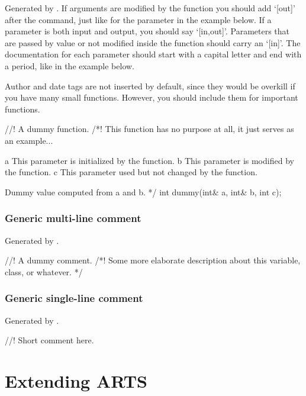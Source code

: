 Generated by . If
arguments are modified by the function you should add `[out]' after
the  command, just like for the parameter
 in the example below. If a parameter is both input and
output, you should say `[in,out]'. Parameters that are passed by
value or not modified inside the function should carry an `[in]'. The
documentation for each parameter should start with a capital letter and
end with a period, like in the example below.

Author and date tags are not inserted by default, since they would be
overkill if you have many small functions. However, you should include
them for important functions. 

\begin{code}
//! A dummy function.
/*! 
 This function has no purpose at all,
 it just serves as an example... 

\param[out]     a This parameter is initialized by the
                  function.
\param[in,out]  b This parameter is modified by the function.
\param[in]      c This parameter used but not changed by the function.

\return   Dummy value computed from a and b.         
*/
int dummy(int& a, int& b, int c);
\end{code}

\subsubsection{Generic multi-line comment}

Generated by .

\begin{code}
//! A dummy comment.
/*! 
 Some more elaborate description about this variable, 
 class, or whatever. 
*/
\end{code}

\subsubsection{Generic single-line comment}

Generated by .

\begin{code}
//! Short comment here.
\end{code}


\section{Extending ARTS}
 \label{sec:development:extending}

